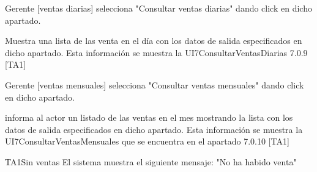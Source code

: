 \begin{UCtrayectoria}{Gerente  [ventas diarias]}
        \UCpaso[\UCactor] selecciona "Consultar ventas diarias" dando click en dicho apartado.
        
        \UCpaso Muestra una lista de las venta  en el día con los datos de salida especificados en dicho apartado. Esta información se muestra la UI7ConsultarVentasDiarias 7.0.9 [TA1]

\end{UCtrayectoria}


\begin{UCtrayectoria}{Gerente  [ventas mensuales]}
        \UCpaso[\UCactor] selecciona "Consultar ventas mensuales" dando click en dicho apartado.
        
        \UCpaso informa al actor un listado  de las ventas en el mes mostrando la lista con los datos de salida especificados en dicho apartado. Esta información se muestra la UI7ConsultarVentasMensuales que se encuentra en el apartado 7.0.10 [TA1]

\end{UCtrayectoria}

\begin{UCtrayectoriaA}{TA1}{Sin ventas}
    \UCpaso El sistema muestra el siguiente mensaje: "No ha habido venta"
    \end{UCtrayectoriaA}
    
